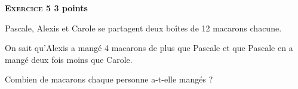 \textbf{\textsc{Exercice 5} \hfill 3 points}

\medskip

Pascale, Alexis et Carole se partagent deux boîtes de 12 macarons chacune.

On sait qu'Alexis a mangé 4 macarons de plus que Pascale et que Pascale en a mangé deux fois
moins que Carole.

Combien de macarons chaque personne a-t-elle mangés ?

\bigskip

